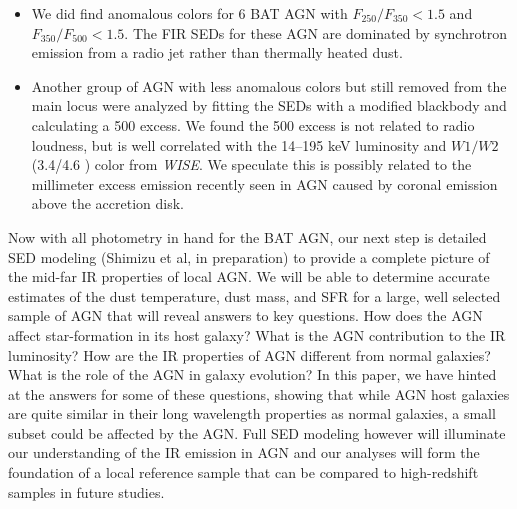 \begin{itemize}
\item We did find anomalous colors for 6 BAT AGN with $F_{250}/F_{350} < 1.5$ and $F_{350}/F_{500} < 1.5$. The FIR SEDs for these AGN are dominated by synchrotron emission from a radio jet rather than thermally heated dust.

\item Another group of AGN with less anomalous colors but still removed from the main locus were analyzed by fitting the SEDs with a modified blackbody and calculating a 500 \um{} excess. We found the 500 \um{} excess is not related to radio loudness, but is well correlated with the 14--195 keV luminosity and $W1/W2$ (3.4/4.6 \um) color from \textit{WISE}. We speculate this is possibly related to the millimeter excess emission recently seen in AGN caused by coronal emission above the accretion disk.
\end{itemize}

Now with all \herschel{} photometry in hand for the BAT AGN, our next step is detailed SED modeling (Shimizu et al, in preparation) to provide a complete picture of the mid-far IR properties of local AGN. We will be able to determine accurate estimates of the dust temperature, dust mass, and SFR for a large, well selected sample of AGN that will reveal answers to key questions. How does the AGN affect star-formation in its host galaxy? What is the AGN contribution to the IR luminosity? How are the IR properties of AGN different from normal galaxies? What is the role of the AGN in galaxy evolution? In this paper, we have hinted at the answers for some of these questions, showing that while AGN host galaxies are quite similar in their long wavelength properties as normal galaxies, a small subset could be affected by the AGN. Full SED modeling however will illuminate our understanding of the IR emission in AGN and our analyses will form the foundation of a local reference sample that can be compared to high-redshift samples in future studies.
  
  
  
  